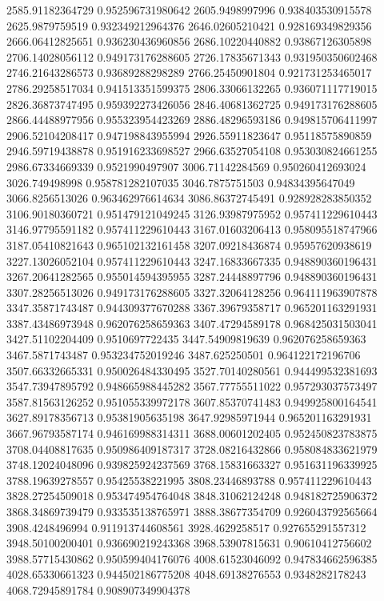 {2585.91182364729 0.952596731980642
2605.9498997996 0.938403530915578
2625.9879759519 0.932349212964376
2646.02605210421 0.928169349829356
2666.06412825651 0.936230436960856
2686.10220440882 0.93867126305898
2706.14028056112 0.949173176288605
2726.17835671343 0.931950350602468
2746.21643286573 0.93689288298289
2766.25450901804 0.921731253465017
2786.29258517034 0.941513351599375
2806.33066132265 0.936071117719015
2826.36873747495 0.959392273426056
2846.40681362725 0.949173176288605
2866.44488977956 0.955323954423269
2886.48296593186 0.949815706411997
2906.52104208417 0.947198843955994
2926.55911823647 0.95118575890859
2946.59719438878 0.951916233698527
2966.63527054108 0.953030824661255
2986.67334669339 0.9521990497907
3006.71142284569 0.950260412693024
3026.749498998 0.958781282107035
3046.7875751503 0.94834395647049
3066.8256513026 0.963462976614634
3086.86372745491 0.928928283850352
3106.90180360721 0.951479121049245
3126.93987975952 0.957411229610443
3146.97795591182 0.957411229610443
3167.01603206413 0.958095518747966
3187.05410821643 0.965102132161458
3207.09218436874 0.95957620938619
3227.13026052104 0.957411229610443
3247.16833667335 0.948890360196431
3267.20641282565 0.955014594395955
3287.24448897796 0.948890360196431
3307.28256513026 0.949173176288605
3327.32064128256 0.964111963907878
3347.35871743487 0.944309377670288
3367.39679358717 0.965201163291931
3387.43486973948 0.962076258659363
3407.47294589178 0.968425031503041
3427.51102204409 0.9510697722435
3447.54909819639 0.962076258659363
3467.5871743487 0.953234752019246
3487.625250501 0.964122172196706
3507.66332665331 0.950026484330495
3527.70140280561 0.944499532381693
3547.73947895792 0.948665988445282
3567.77755511022 0.957293037573497
3587.81563126252 0.951055339972178
3607.85370741483 0.949925800164541
3627.89178356713 0.95381905635198
3647.92985971944 0.965201163291931
3667.96793587174 0.946169988314311
3688.00601202405 0.952450823783875
3708.04408817635 0.950986409187317
3728.08216432866 0.958084833621979
3748.12024048096 0.939825924237569
3768.15831663327 0.951631196339925
3788.19639278557 0.95425538221995
3808.23446893788 0.957411229610443
3828.27254509018 0.953474954764048
3848.31062124248 0.948182725906372
3868.34869739479 0.933535138765971
3888.38677354709 0.926043792565664
3908.4248496994 0.911913744608561
3928.4629258517 0.927655291557312
3948.50100200401 0.936690219243368
3968.53907815631 0.90610412756602
3988.57715430862 0.950599404176076
4008.61523046092 0.947834662596385
4028.65330661323 0.944502186775208
4048.69138276553 0.9348282178243
4068.72945891784 0.908907349904378
}
